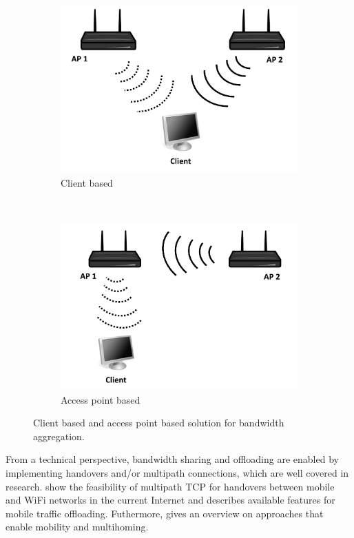 \begin{figure}[tb]
    \centering
    \begin{subfigure}[t]{0.5\textwidth}
        \centering
        \includegraphics[width=.8\textwidth]{aggregation/background/figures/aggr_client_sw}
        \caption{Client based}
				\label{fig:aggregation:background:aggrclient}
    \end{subfigure}%
    ~
    \begin{subfigure}[t]{0.5\textwidth}
        \centering
        \includegraphics[width=.8\textwidth]{aggregation/background/figures/aggr_ap_sw}
        \caption{Access point based}
				\label{fig:aggregation:background:aggrap}
    \end{subfigure}
    \caption{Client based and access point based solution for bandwidth aggregation.}
		\label{fig:aggregation:background:aggr}
\end{figure}

From a technical perspective, bandwidth sharing and offloading are enabled by implementing handovers and/or multipath connections, which are well covered in research. \cite{gonzalez2013radio,paasch2012exploring,chen2013energy} show the feasibility of multipath TCP for handovers between mobile and WiFi networks in the current Internet and \cite{khadraoui2014survey} describes available features for mobile traffic offloading. Futhermore, \cite{gladisch2014survey} gives an overview on approaches that enable mobility and multihoming.

